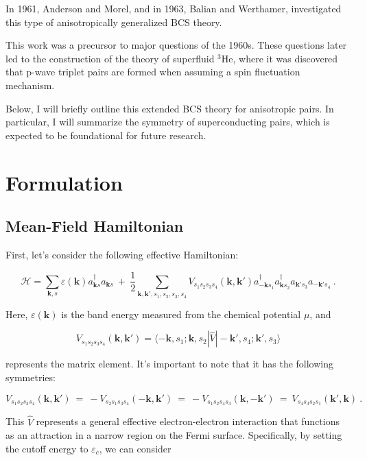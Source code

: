 \documentclass[uplatex,a4j,12pt,dvipdfmx]{jsarticle}
\begin{document}
In 1961, Anderson and Morel, and in 1963, Balian and Werthamer, investigated this type of anisotropically generalized BCS theory.

This work was a precursor to major questions of the 1960s.
These questions later led to the construction of the theory of superfluid $^3$He, where it was discovered that p-wave triplet pairs are formed when assuming a spin fluctuation mechanism.

Below, I will briefly outline this extended BCS theory for anisotropic pairs.
In particular, I will summarize the symmetry of superconducting pairs, which is expected to be foundational for future research.

\section{Formulation}

\subsection{Mean-Field Hamiltonian}

First, let's consider the following effective Hamiltonian:

$$
	\mathcal{H}
	=
	\sum_{\bm{k},s}
	\varepsilon(\bm{k})
	a_{\bm{k} s}^{\dagger}
	a_{\bm{k} s}
	\ + \
	\dfrac{1}{2}
	\sum_{\bm{k},\bm{k}',s_{1},s_{2},s_{3},s_{4}}
	V_{s_{1} s_{2} s_{3} s_{4}}(\bm{k},\bm{k}')
	a_{-\bm{k} s_{1}}^{\dagger}
	a_{\bm{k} s_{2}}^{\dagger}
	a_{\bm{k}' s_{3}}
	a_{-\bm{k}' s_{4}}
	\ .
$$

Here, $\varepsilon(\bm{k})$ is the band energy measured from the chemical potential $\mu$, and

\[
	V_{s_{1} s_{2} s_{3} s_{4}}(\bm{k},\bm{k}')
	=
	\langle
	- \bm{k} , s_{1} ; \bm{k} , s_{2}
	|
	\hat{V}
	|
	- \bm{k}' , s_{4} ; \bm{k}' , s_{3}
	\rangle
	\nonumber
\]


represents the matrix element.
It's important to note that it has the following symmetries:

\[
	V_{s_{1} s_{2} s_{3} s_{4}}(\bm{k},\bm{k}')
	\ = \
	- V_{s_{2} s_{1} s_{3} s_{4}}( - \bm{k},\bm{k}')
	\ = \
	- V_{s_{1} s_{2} s_{4} s_{3}}(\bm{k}, - \bm{k}')
	\ = \
	V_{s_{4} s_{3} s_{2} s_{1}}( \bm{k}' , \bm{k})
	\ .
	\nonumber
\]

This $\hat{V}$ represents a general effective electron-electron interaction that functions as an attraction in a narrow region on the Fermi surface.
Specifically, by setting the cutoff energy to $\varepsilon_{c}$, we can consider
\end{document}
